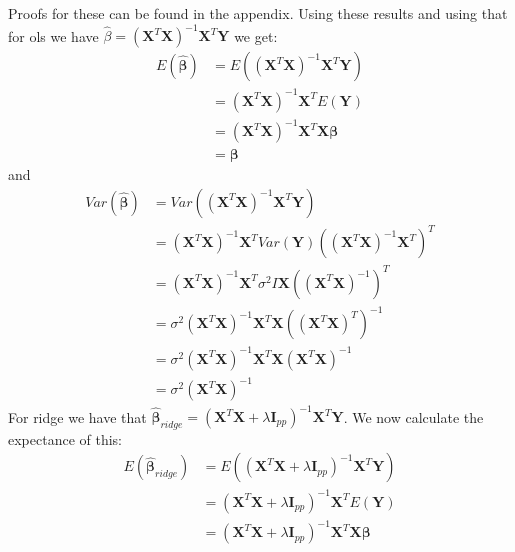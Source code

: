\documentclass{article}
\begin{document}
Proofs for these can be found in the appendix. Using these results and using
that for ols we have $\hat{\beta} = (\mathbf{X}^T \mathbf{X})^{-1} \mathbf{X}^T
    \mathbf{Y}$ we get:
\begin{align*}
    E(\hat{\bm{\beta}}) & = E((\mathbf{X}^T \mathbf{X})^{-1} \mathbf{X}^T \mathbf{Y})         \\
                        & = (\mathbf{X}^T \mathbf{X})^{-1} \mathbf{X}^T E(\mathbf{Y})         \\
                        & = (\mathbf{X}^T \mathbf{X})^{-1} \mathbf{X}^T \mathbf{X} \bm{\beta} \\
                        & = \bm{\beta}
\end{align*}
and
\begin{align*}
    Var(\hat{\bm{\beta}}) & = Var((\mathbf{X}^T \mathbf{X})^{-1} \mathbf{X}^T \mathbf{Y})                                                              \\
                          & = (\mathbf{X}^T \mathbf{X})^{-1} \mathbf{X}^T Var(\mathbf{Y}) \left( (\mathbf{X}^T \mathbf{X})^{-1} \mathbf{X}^T \right)^T \\
                          & = (\mathbf{X}^T \mathbf{X})^{-1} \mathbf{X}^T \sigma^2 I \mathbf{X} \left( (\mathbf{X}^T \mathbf{X})^{-1} \right)^T        \\
                          & = \sigma^2 (\mathbf{X}^T \mathbf{X})^{-1} \mathbf{X}^T \mathbf{X} \left((\mathbf{X}^T \mathbf{X})^T \right)^{-1}           \\
                          & = \sigma^2 (\mathbf{X}^T \mathbf{X})^{-1} \mathbf{X}^T \mathbf{X} (\mathbf{X}^T \mathbf{X})^{-1}                           \\
                          & = \sigma^2 (\mathbf{X}^T \mathbf{X})^{-1}
\end{align*}
For ridge we have that $\hat{\bm{\beta}}_{ridge} = (\mathbf{X}^T \mathbf{X} + \lambda
    \mathbf{I}_{p p})^{-1} \mathbf{X}^T \mathbf{Y}$. We now calculate the expectance
of this:
\begin{align*}
    E(\hat{\bm{\beta}}_{ridge}) & = E((\mathbf{X}^T \mathbf{X} + \lambda \mathbf{I}_{p p})^{-1} \mathbf{X}^T \mathbf{Y})         \\
                                & = (\mathbf{X}^T \mathbf{X} + \lambda \mathbf{I}_{p p})^{-1} \mathbf{X}^T E(\mathbf{Y})         \\
                                & = (\mathbf{X}^T \mathbf{X} + \lambda \mathbf{I}_{p p})^{-1} \mathbf{X}^T \mathbf{X} \bm{\beta}
\end{align*}
\end{document}

